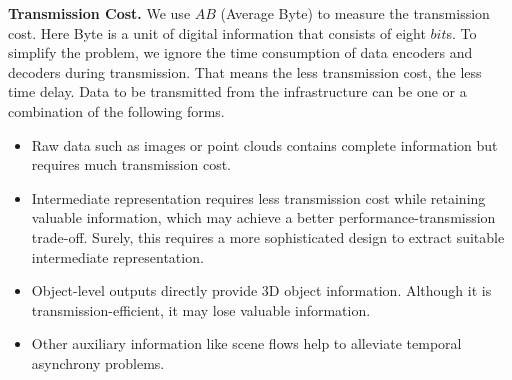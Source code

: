 \noindent\textbf{Transmission Cost.}
We use $AB$ (Average Byte) to measure the transmission cost.
Here Byte is a unit of digital information that consists of eight $bit$s. 
To simplify the problem, we ignore the time consumption of data encoders and decoders during transmission.
That means the less transmission cost, the less time delay.
Data to be transmitted from the infrastructure can be one or a combination of the following forms.
\begin{itemize}
    \item Raw data such as images or point clouds contains complete information but requires much transmission cost. 
    \item Intermediate representation requires less transmission cost while retaining valuable information, which may achieve a better performance-transmission trade-off. 
    Surely, this requires a more sophisticated design to extract suitable intermediate representation.
    \item Object-level outputs directly provide 3D object information. Although it is transmission-efficient, it may lose valuable information.
    \item Other auxiliary information like scene flows help to alleviate temporal asynchrony problems. 
\end{itemize}